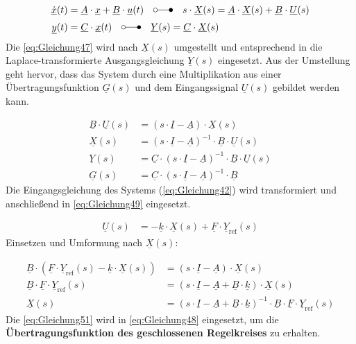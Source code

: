 \begin{align}
    \underline{\dot{x}}(t) &= \underline{A}\cdot\underline{x}+\underline{B}\cdot\underline{u}(t)\quad\laplace\quad s\cdot \underline{X}(s) = \underline{A}\cdot\underline{X}(s)+\underline{B}\cdot\underline{U}(s) \label{eq:Gleichung47}\\
    \underline{y}(t) &= \underline{C}\cdot\underline{x}(t) \quad\laplace\quad \underline{Y}(s) = \underline{C}\cdot\underline{X}(s) \label{eq:Gleichung48}
\end{align}
\newline
Die \autoref{eq:Gleichung47} wird nach $\underline{X}(s)$ umgestellt und entsprechend in die Laplace-transformierte Ausgangsgleichung $\underline{Y}(s)$ eingesetzt. Aus der Umstellung geht hervor, dass das System durch eine Multiplikation aus einer Übertragungsfunktion $\underline{G}(s)$ und dem Eingangssignal $\underline{U}(s)$ gebildet werden kann.

\begin{align}
    \underline{B}\cdot\underline{U}(s) &= (s\cdot\underline{I}-\underline{A})\cdot\underline{X}(s) \label{eq:Gleichung49}\\
    \underline{X}(s) &= (s\cdot\underline{I}-\underline{A})^{-1}\cdot\underline{B}\cdot\underline{U}(s) \nonumber \\
    \underline{Y}(s) &= \underline{C}\cdot(s\cdot\underline{I}-\underline{A})^{-1}\cdot\underline{B}\cdot\underline{U}(s) \label{eq:Gleichung50}\\
    \underline{G}(s) &= \underline{C}\cdot(s\cdot\underline{I}-\underline{A})^{-1}\cdot\underline{B} \nonumber
\end{align}
\newline
Die Eingangsgleichung des Systems (\autoref{eq:Gleichung42}) wird transformiert und anschließend in \autoref{eq:Gleichung49} eingesetzt.

\begin{align*}
    \underline{U}(s) &= -\underline{k}\cdot\underline{X}(s)+\underline{F}\cdot\underline{Y}_{\mathrm{ref}}(s)
\end{align*}
\newline
Einsetzen und Umformung nach $\underline{X}(s)$:

\begin{align}
    \underline{B}\cdot(\underline{F}\cdot\underline{Y}_{\mathrm{ref}}(s)-\underline{k}\cdot\underline{X}(s)) &= (s\cdot\underline{I}-\underline{A})\cdot\underline{X}(s) \nonumber \\
    \underline{B}\cdot \underline{F}\cdot\underline{Y}_{\mathrm{ref}}(s) &= (s\cdot\underline{I}-\underline{A}+\underline{B}\cdot{\underline{k}})\cdot\underline{X}(s) \nonumber \\
    \underline{X}(s) &= (s\cdot\underline{I}-\underline{A}+\underline{B}\cdot{\underline{k}})^{-1}\cdot\underline{B}\cdot \underline{F}\cdot\underline{Y}_{\mathrm{ref}}(s) \label{eq:Gleichung51}
\end{align}
\newline
Die \autoref{eq:Gleichung51} wird in \autoref{eq:Gleichung48} eingesetzt, um die \textbf{Übertragungsfunktion des geschlossenen Regelkreises} zu erhalten.

